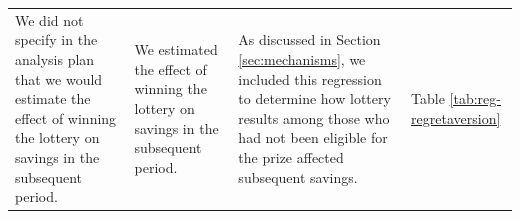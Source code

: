 \documentclass[11pt]{article}
\begin{document}
\begin{landscape}
\begin{longtable}{p{}p{}p{}p{}}
			\midrule
			We did not specify in the analysis plan that we would estimate the effect of winning the lottery on savings in the subsequent period. & We estimated the effect of winning the lottery on savings in the subsequent period. & As discussed in Section \ref{sec:mechanisms}, we included this regression to determine how lottery results among those who had not been eligible for the prize affected subsequent savings. & Table \ref{tab:reg-regretaversion} \\
		\end{longtable}

	\end{landscape}

	
	
	
	
	

	\clearpage
\end{document}
